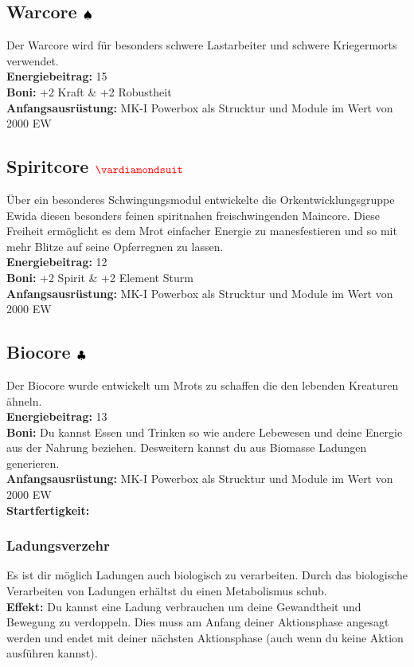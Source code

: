 \subsection*{Warcore ${\color{blue} }{\color{black}\spadesuit}$}
Der Warcore wird für besonders schwere Lastarbeiter und schwere Kriegermorts verwendet.\\
\textbf{Energiebeitrag:} 15 \\
\textbf{Boni:} +2 Kraft \& +2 Robustheit \\
\textbf{Anfangsausrüstung:} MK-I Powerbox als Strucktur und Module im Wert von 2000 EW\\

\subsection*{Spiritcore $\Karo{}$}
Über ein besonderes Schwingungsmodul entwickelte die Orkentwicklungsgruppe Ewida diesen besonders feinen spiritnahen freischwingenden Maincore. Diese Freiheit ermöglicht es dem Mrot einfacher Energie zu manesfestieren und so mit mehr Blitze auf seine Opferregnen zu lassen.\\
\textbf{Energiebeitrag:} 12 \\
\textbf{Boni:} +2 Spirit \& +2 Element Sturm \\
\textbf{Anfangsausrüstung:} MK-I Powerbox als Strucktur und Module im Wert von 2000 EW \\

\subsection*{Biocore ${\color{blue} }{\color{black}\clubsuit}$} \label{biocore}
Der Biocore wurde entwickelt um Mrots zu schaffen die den lebenden Kreaturen ähneln. \\
\textbf{Energiebeitrag:} 13 \\
\textbf{Boni:} Du kannst Essen und Trinken so wie andere Lebewesen und deine Energie aus der Nahrung beziehen. Desweitern kannst du aus Biomasse Ladungen generieren. \\
\textbf{Anfangsausrüstung:} MK-I Powerbox als Strucktur und Module im Wert von 2000 EW \\
\textbf{Startfertigkeit:}

\subsubsection*{Ladungsverzehr} \label{sk:ladungsverzer}
Es ist dir möglich Ladungen auch biologisch zu verarbeiten. Durch das biologische Verarbeiten von Ladungen erhältst du einen Metabolismus schub.\\
\textbf{Effekt:} Du kannst eine Ladung verbrauchen um deine Gewandtheit und Bewegung zu verdoppeln. Dies muss am Anfang deiner Aktionsphase angesagt werden und endet mit deiner nächsten Aktionsphase (auch wenn du keine Aktion ausführen kannst).


